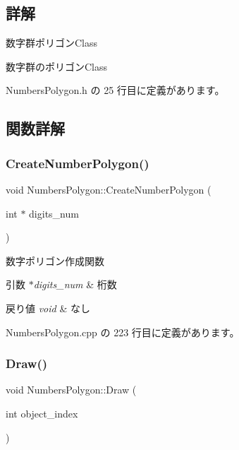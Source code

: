 \subsection{詳解}
数字群ポリゴン\+Class 

数字群のポリゴン\+Class 

 Numbers\+Polygon.\+h の 25 行目に定義があります。



\subsection{関数詳解}
\mbox{\label{class_numbers_polygon_a39fb3c9662ff26a96dedad55ed7c400e}} 
\subsubsection{\texorpdfstring{Create\+Number\+Polygon()}{CreateNumberPolygon()}}
{\footnotesize\ttfamily void Numbers\+Polygon\+::\+Create\+Number\+Polygon (\begin{DoxyParamCaption}\item[{int $\ast$}]{digits\+\_\+num }\end{DoxyParamCaption})\hspace{0.3cm}{\ttfamily [private]}}



数字ポリゴン作成関数 


\begin{DoxyParams}{引数}
{\em $\ast$digits\+\_\+num} & 桁数 \\
\hline
\end{DoxyParams}

\begin{DoxyRetVals}{戻り値}
{\em void} & なし \\
\hline
\end{DoxyRetVals}


 Numbers\+Polygon.\+cpp の 223 行目に定義があります。

\mbox{\label{class_numbers_polygon_a38ee9290de377abc33515f870d5488c5}} 
\subsubsection{\texorpdfstring{Draw()}{Draw()}}
{\footnotesize\ttfamily void Numbers\+Polygon\+::\+Draw (\begin{DoxyParamCaption}\item[{int}]{object\+\_\+index }\end{DoxyParamCaption})}



